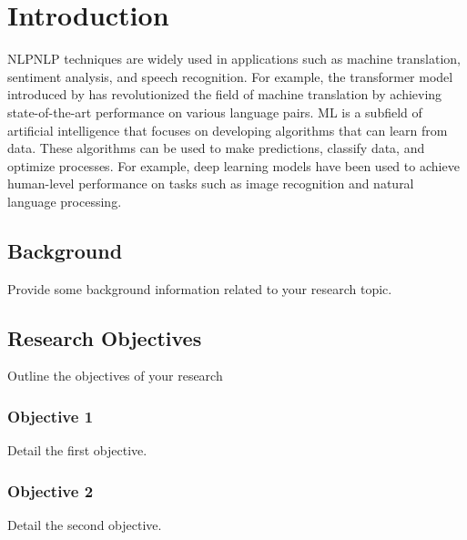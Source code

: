 \chapter{Introduction}


\gls{NLP}NLP techniques are widely used in applications such as machine translation, sentiment analysis, and speech recognition. For example, the transformer model introduced by has revolutionized the field of machine translation by achieving state-of-the-art performance on various language pairs\citep{zhang2014research}.
\gls{ML} is a subfield of artificial intelligence that focuses on developing algorithms that can learn from data. These algorithms can be used to make predictions, classify data, and optimize processes. For example, deep learning models have been used to achieve human-level performance on tasks such as image recognition and natural language processing.

\section{Background}

Provide some background information related to your research topic.

\section{Research Objectives}

Outline the objectives of your research
\subsection{Objective 1}

Detail the first objective.

\subsection{Objective 2}

Detail the second objective.

